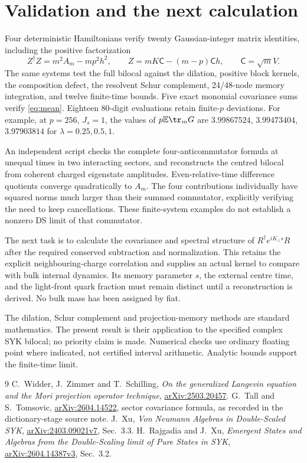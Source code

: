 \documentclass[11pt,a4paper]{article}
\newcommand{\EE}{\mathbb E}
\begin{document}
\newpage
\section*{Validation and the next calculation}
Four deterministic Hamiltonians verify twenty Gaussian-integer matrix
identities, including the positive factorization
\begin{equation}
 Z^\dagger Z=m^2 A_m-mp^2h^2,\qquad
 Z=mK\mathsf C-(m-p)\mathsf C h,\qquad \mathsf C=\sqrt m V.
\end{equation}
The same systems test the full bilocal against the dilation, positive
block kernels, the composition defect, the resolvent Schur complement,
24/48-node memory integration, and twelve finite-time bounds.
Five exact monomial covariance sums verify \eqref{eq:mean}.
Eighteen 80-digit evaluations retain finite-$p$ deviations. For example,
at $p=256$, $J_s=1$, the values of $p\EE\tr_mG$ are
$3.99867524$, $3.99473404$, $3.97903814$ for
$\lambda=0.25,0.5,1$.

An independent script checks the complete four-anticommutator formula
at unequal times in two interacting sectors, and reconstructs the
centred bilocal from coherent charged eigenstate amplitudes.
Even-relative-time difference quotients converge quadratically to
$A_m$. The four contributions individually have squared norms much
larger than their summed commutator, explicitly verifying the need
to keep cancellations. These finite-system examples do not establish
a nonzero DS limit of that commutator.

The next task is to calculate the covariance and spectral structure of
$R^\dagger e^{iK_\perp s}R$ after the required conserved subtraction
and normalization. This retains the explicit neighbouring-charge
correlation and supplies an actual kernel to compare with bulk
internal dynamics. Its memory parameter $s$, the external centre time,
and the light-front quark fraction must remain distinct until a
reconstruction is derived. No bulk mass has been assigned by fiat.

The dilation, Schur complement and projection-memory methods are
standard mathematics. The present result is their application to the
specified complex SYK bilocal; no priority claim is made. Numerical
checks use ordinary floating point where indicated, not certified
interval arithmetic. Analytic bounds support the finite-time limit.

\begin{thebibliography}{9}
 C.~Widder, J.~Zimmer and T.~Schilling,
\emph{On the generalized Langevin equation and the Mori projection
operator technique}, \href{https://arxiv.org/abs/2503.20457}{arXiv:2503.20457}.
 G.~Tall and S.~Tomsovic,
\href{https://arxiv.org/abs/2604.14522}{arXiv:2604.14522},
sector covariance formula, as recorded in the dictionary-stage source note.
 J.~Xu, \emph{Von Neumann Algebras in Double-Scaled SYK},
\href{https://arxiv.org/abs/2403.09021v7}{arXiv:2403.09021v7}, Sec.~3.3.
 H.~Rajgadia and J.~Xu,
\emph{Emergent States and Algebras from the Double-Scaling limit of
Pure States in SYK}, \href{https://arxiv.org/abs/2604.14387v3}{arXiv:2604.14387v3},
Sec.~3.2.
\end{thebibliography}
\end{document}
